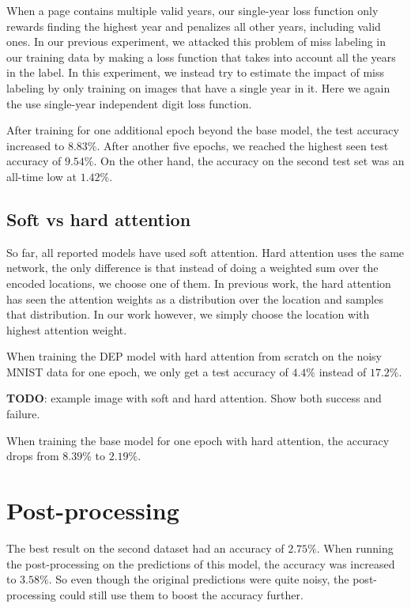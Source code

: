 When a page contains multiple valid years, our single-year loss function only rewards finding the highest year and penalizes all other years, including valid ones.
In our previous experiment, we attacked this problem of miss labeling in our training data by making a loss function that takes into account all the years in the label. In this experiment, we instead try to estimate the impact of miss labeling by only training on images that have a single year in it. Here we again the use single-year independent digit loss function.

After training for one additional epoch beyond the base model, the test accuracy increased to $8.83\%$.
After another five epochs, we reached the highest seen test accuracy of $9.54\%$. On the other hand, the accuracy on the second test set was an all-time low at $1.42\%$.

\subsection{Soft vs hard attention} \label{sssec:result_attention}



So far, all reported models have used soft attention. Hard attention uses the same network, the only difference is that instead of doing a weighted sum over the encoded locations, we choose one of them. In previous work, the hard attention has seen the attention weights as a distribution over the location and samples that distribution. In our work however, we simply choose the location with highest attention weight.

When training the DEP model with hard attention from scratch on the noisy MNIST data for one epoch, we only get a test accuracy of $4.4\%$ instead of $17.2\%$.

\textbf{TODO}: example image with soft and hard attention. Show both success and failure.

When training the base model for one epoch with hard attention, the accuracy drops from $8.39\%$ to $2.19\%$.

\section{Post-processing} \label{sec:result_post_process}

The best result on the second dataset had an accuracy of $2.75\%$. When running the post-processing on the predictions of this model, the accuracy was increased to $3.58\%$. So even though the original predictions were quite noisy, the post-processing could still use them to boost the accuracy further.

